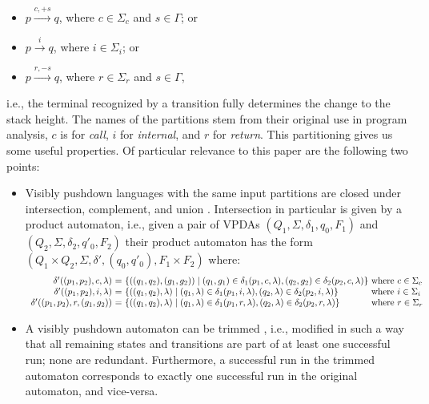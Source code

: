 \documentclass[runningheads]{llncs}
\newcommand{\T}{\Sigma} %
\begin{document}
\begin{itemize}
\item $p \xrightarrow{c, +s} q$, where $c \in \T_c$ and $s \in \Gamma$; or
\item $p \xrightarrow{i} q$, where $i \in \T_i$; or
\item $p \xrightarrow{r, -s} q$, where $r \in \T_r$ and $s \in \Gamma$,
\end{itemize}

\noindent i.e., the terminal recognized by a transition fully determines the change to the stack height.
%
The names of the partitions stem from their original use in program analysis, $c$ is for \emph{call}, $i$ for \emph{internal}, and $r$ for \emph{return}.
%
This partitioning gives us some useful properties. Of particular relevance to this paper are the following two points:

\begin{itemize}
\item Visibly pushdown languages with the same input partitions are closed under intersection, complement, and union \cite{alurVisiblyPushdownLanguages2004}. Intersection in particular is given by a product automaton, i.e., given a pair of VPDAs $(Q_1, \T, \delta_1, q_0, F_1)$ and $(Q_2, \T, \delta_2, q'_0, F_2)$ their product automaton has the form $(Q_1 \times Q_2, \T, \delta', (q_0, q'_0), F_1 \times F_2)$ where:
  $$
  \begin{array}{r@{\ =\ }ll}
    \delta'((p_1, p_2), c, \lambda) & \{((q_1, q_2), (g_1, g_2)) \mid (q_1, g_1) \in \delta_1(p_1, c, \lambda), (q_2, g_2) \in \delta_2(p_2, c, \lambda) \} & \!\!\!\!\text{where } c \in \T_c \\
    \delta'((p_1, p_2), i, \lambda) & \{((q_1, q_2), \lambda) \mid (q_1, \lambda) \in \delta_1(p_1, i, \lambda), (q_2, \lambda) \in \delta_2(p_2, i, \lambda) \} & \!\!\!\!\text{where } i \in \T_i \\
    \delta'((p_1, p_2), r, (g_1, g_2)) & \{((q_1, q_2), \lambda) \mid (q_1, \lambda) \in \delta_1(p_1, r, \lambda), (q_2, \lambda) \in \delta_2(p_2, r, \lambda) \} & \!\!\!\!\text{where } r \in \T_r \\
  \end{array}
  $$

\item A visibly pushdown automaton can be trimmed \cite{caralpTrimmingVisiblyPushdown2015}, i.e., modified in such a way that all remaining states and transitions are part of at least one successful run; none are redundant. Furthermore, a successful run in the trimmed automaton corresponds to exactly one successful run in the original automaton, and vice-versa.
\end{itemize}
\end{document}
